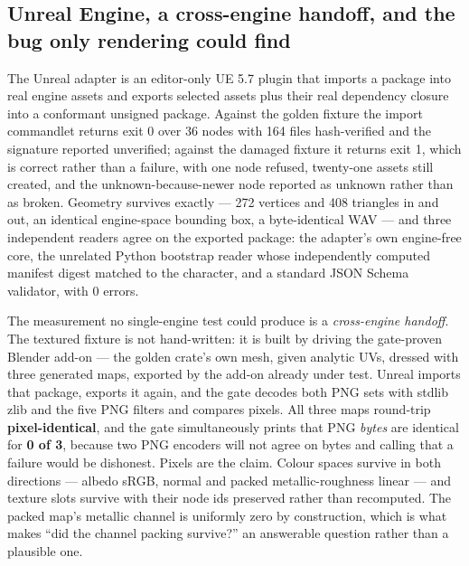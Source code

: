 \documentclass[10pt,twocolumn,letterpaper]{article}
\begin{document}
\subsection{Unreal Engine, a cross-engine handoff, and the bug only rendering could find}

The Unreal adapter is an editor-only UE 5.7 plugin that imports a package into real engine assets and exports selected assets plus their real dependency closure into a conformant unsigned package. Against the golden fixture the import commandlet returns exit 0 over 36 nodes with 164 files hash-verified and the signature reported unverified; against the damaged fixture it returns exit 1, which is correct rather than a failure, with one node refused, twenty-one assets still created, and the unknown-because-newer node reported as unknown rather than as broken. Geometry survives exactly --- 272 vertices and 408 triangles in and out, an identical engine-space bounding box, a byte-identical WAV --- and three independent readers agree on the exported package: the adapter's own engine-free core, the unrelated Python bootstrap reader whose independently computed manifest digest matched to the character, and a standard JSON Schema validator, with 0 errors.

The measurement no single-engine test could produce is a \emph{cross-engine handoff}. The textured fixture is not hand-written: it is built by driving the gate-proven Blender add-on --- the golden crate's own mesh, given analytic UVs, dressed with three generated maps, exported by the add-on already under test. Unreal imports that package, exports it again, and the gate decodes both PNG sets with stdlib zlib and the five PNG filters and compares pixels. All three maps round-trip \textbf{pixel-identical}, and the gate simultaneously prints that PNG \emph{bytes} are identical for \textbf{0 of 3}, because two PNG encoders will not agree on bytes and calling that a failure would be dishonest. Pixels are the claim. Colour spaces survive in both directions --- albedo sRGB, normal and packed metallic-roughness linear --- and texture slots survive with their node ids preserved rather than recomputed. The packed map's metallic channel is uniformly zero by construction, which is what makes ``did the channel packing survive?'' an answerable question rather than a plausible one.
\end{document}
